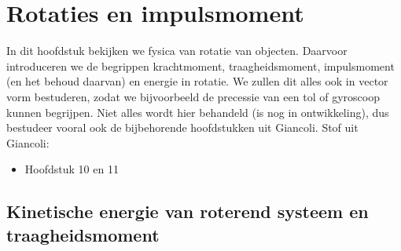 
\newcommand{\bra}[1]{\langle #1 \vert}
\newcommand{\ket}[1]{\vert #1 \rangle}
\newcommand{\bm}[1]{\mbox{\boldmath $#1$}}
\newcommand{\be}{\begin{equation}}
\def\lambdabar{\rlap{$^-$} \lambda}
\newcommand{\ee}{\end{equation}}
\newcommand{\bea}{\begin{eqnarray}}
\newcommand{\eea}{\end{eqnarray}}
\newcommand{\bean}{\begin{eqnarray*}}
\newcommand{\eean}{\end{eqnarray*}}


\chapter{Rotaties en impulsmoment}

In dit hoofdstuk bekijken we fysica van rotatie van objecten. Daarvoor introduceren we de begrippen krachtmoment, traagheidsmoment, impulsmoment (en het behoud daarvan) en energie in rotatie. We zullen dit alles ook in vector vorm bestuderen, zodat we bijvoorbeeld de precessie van een tol of gyroscoop kunnen begrijpen. Niet alles wordt hier behandeld (is nog in ontwikkeling), dus bestudeer vooral ook de bijbehorende hoofdstukken uit Giancoli.
\newline
\newline
Stof uit Giancoli:
\begin{itemize}
\item Hoofdstuk 10 en 11
\end{itemize}



\section{Kinetische energie van roterend systeem en traagheidsmoment
\label{kinrot}}

